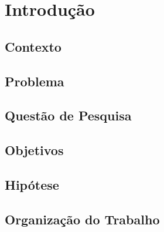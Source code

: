 \chapter{Introdução}


\section {Contexto}

\section{Problema}



\section{Questão de Pesquisa}


\section{Objetivos}

\section{Hipótese}


\section{Organização do Trabalho}
